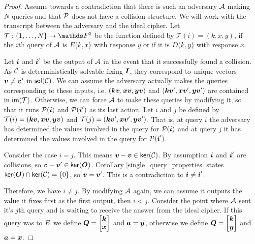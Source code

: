 \begin{proof}
    Assume towards a contradiction that there is such an adversary $\A$ making $N$ queries
    and that $\P$ does not have a collision structure.
    We will work with the transcript between the adversary and the ideal cipher.
    Let $\mathcal{T}: \{1, \dots, N\} \to \F^3$ be the function defined by $\mathcal{T}(i) = (k, x, y)$,
    if the $i$th query of $\A$ is $\E(k, x)$ with response $y$ or if it is $\D(k, y)$ with response $x$.

    Let $\v i$ and $\v i'$ be the output of $\A$ in the event that it successfully found a collision.
    As $\C$ is deterministically solvable fixing $\I$, they correspond to unique vectors $\vv \neq \vv'$ in $\sol(\C)$.
    We can assume the adversary actually makes the queries corresponding to these inputs,
    i.e. $(\vk \vv, \vx \vv, \vy \vv)$ and $(\vk \vv', \vx \vv', \vy \vv')$ are contained in $\im(\mathcal{T})$.
    Otherwise, we can force $\A$ to make these queries by modifying it,
    so that it runs $\P(\v i)$ and $\P(\v i')$ as its last action.
    Let $i$ and $j$ be defined by $\mathcal{T}(i) = (\vk \vv, \vx \vv, \vy \vv)$
    and $\mathcal{T}(j) = (\vk \vv', \vx \vv', \vy \vv')$. 
    That is, at query $i$ the adversary has determined the values involved in the query for $\P(\v i)$ and
    at query $j$ it has determined the values involved in the query for $\P(\v i')$.
    
    Consider the case $i = j$.
    This means $\vv - \vv \in \ker(\C)$.
    By assumption $\v i$ and $\v i'$ are collisions, so $\vv - \vv' \in \ker(\O)$.
    Corollary \ref{single_query_properties} states $\ker(\O) \cap \ker(\C) = \{0\}$,
    so $\vv = \vv'$. 
    This is a contradiction to $\v i \neq \v i'$.
    
    Therefore, we have $i \neq j$.
    By modifying $\A$ again,
    we can assume it outputs the value it fixes first as the first output, then $i < j$.
    Consider the point where $\A$ sent it's $j$th query and is waiting to receive the answer from the ideal cipher.
    If this query was to $\E$ we define $\Q = \m{\vk \\ \vx}$ and $\va = \vy$,
    otherwise we define $\Q = \m{\vk \\ \vy}$ and $\va = \vx$.
    

\end{proof}
